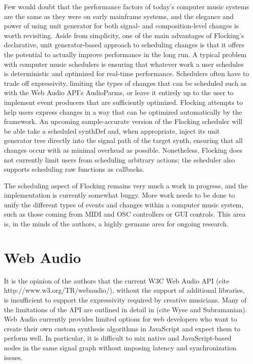 \documentclass{article}
\begin{document}
Few would doubt that the performance factors of today's computer music systems are the same as they were on early mainframe systems, and the elegance and power of using unit generator for both signal- and composition-level changes is worth revisiting. Aside from simplicity, one of the main advantages of Flocking's declarative, unit generator-based approach to scheduling changes is that it offers the potential to actually improve performance in the long run. A typical problem with computer music schedulers is ensuring that whatever work a user schedules is deterministic and optimized for real-time performance. Schedulers often have to trade off expressivity, limiting the types of changes that can be scheduled such as with the Web Audio API's AudioParms, or leave it entirely up to the user to implement event producers that are sufficiently optimized. Flocking attempts to help users express changes in a way that can be optimized automatically by the framework. An upcoming sample-accurate version of the Flocking scheduler will be able take a scheduled synthDef and, when appropriate, inject its unit generator tree directly into the signal path of the target synth, ensuring that all changes occur with as minimal overhead as possible. Nonetheless, Flocking does not currently limit users from scheduling arbitrary actions; the scheduler also supports scheduling raw functions as callbacks.

The scheduling aspect of Flocking remains very much a work in progress, and the implementation is currently somewhat buggy. More work needs to be done to unify the different types of events and changes within a computer music system, such as those coming from MIDI and OSC controllers or GUI controls. This area is, in the minds of the authors, a highly germane area for ongoing research.

\section{Web Audio}

It is the opinion of the authors that the current W3C Web Audio API (cite http://www.w3.org/TR/webaudio/), without the support of additional libraries, is insufficient to support the expressivity required by creative musicians. Many of the limitations of the API are outlined in detail in (cite Wyse and Subramanian). Web Audio currently provides limited options for web developers who want to create their own custom synthesis algorithms in JavaScript and expect them to perform well. In particular, it is difficult to mix native and JavaScript-based nodes in the same signal graph without imposing latency and synchronization issues.
\end{document}
